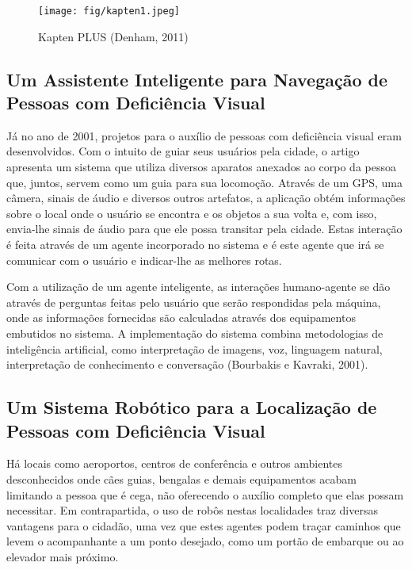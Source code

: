 \begin{figure}[H]
\centering
\caption[Ferramenta Kapten PLUS]{\label{fig:fig2}Kapten PLUS (Denham, 2011)}
\texttt{[image: fig/kapten1.jpeg]}
\end{figure}


\subsection{Um Assistente Inteligente para Navegação de Pessoas com Deficiência Visual}
Já no ano de 2001, projetos para o auxílio de pessoas com deficiência visual eram desenvolvidos. Com o intuito de guiar seus usuários pela cidade, o artigo apresenta um sistema que utiliza diversos aparatos anexados ao corpo da pessoa que, juntos, servem como um guia para sua locomoção. Através de um GPS, uma câmera, sinais de áudio e diversos outros artefatos, a aplicação obtém informações sobre o local onde o usuário se encontra e os objetos a sua volta e, com isso, envia-lhe sinais de áudio para que ele possa transitar pela cidade. Estas interação é feita através de um agente incorporado no sistema e é este agente que irá se comunicar com o usuário e indicar-lhe as melhores rotas.

Com a utilização de um agente inteligente, as interações humano-agente se dão através de perguntas feitas pelo usuário que serão respondidas pela máquina, onde as informações fornecidas são calculadas através dos equipamentos embutidos no sistema. A implementação do sistema combina metodologias de inteligência artificial, como interpretação de imagens, voz, linguagem natural, interpretação de conhecimento e conversação (Bourbakis e Kavraki, 2001)\nocite{BOURBAKIS2001}.

\subsection{Um Sistema Robótico para a Localização de Pessoas com Deficiência Visual}
Há locais como aeroportos, centros de conferência e outros ambientes desconhecidos onde cães guias, bengalas e demais equipamentos acabam limitando a pessoa que é cega, não oferecendo o auxílio completo que elas possam necessitar. Em contrapartida, o uso de robôs nestas localidades traz diversas vantagens para o cidadão, uma vez que estes agentes podem traçar caminhos que levem o acompanhante a um ponto desejado, como um portão de embarque ou ao elevador mais próximo.

